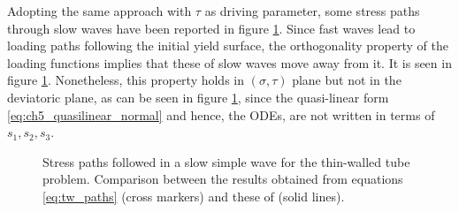 Adopting the same approach with $\tau$ as driving parameter, some stress paths through slow waves have been reported in figure \ref{fig:tw_slow}.
Since fast waves lead to loading paths following the initial yield surface, the orthogonality property of the loading functions implies that these of slow waves move away from it.
It is seen in figure \ref{fig:tw_slow}.
Nonetheless, this property holds in $(\sigma,\tau)$ plane but not in the deviatoric plane, as can be seen in figure \ref{fig:tw_slow}, since the quasi-linear form \eqref{eq:ch5_quasilinear_normal} and hence, the ODEs, are not written in terms of $s_1,s_2,s_3$.
\begin{figure}[h!]
  \centering
   \qquad
  \caption{Stress paths followed in a slow simple wave for the thin-walled tube problem. Comparison between the results obtained from equations \eqref{eq:tw_paths} (cross markers) and these of \cite{Clifton} (solid lines).}
  \label{fig:tw_slow}
\end{figure}



